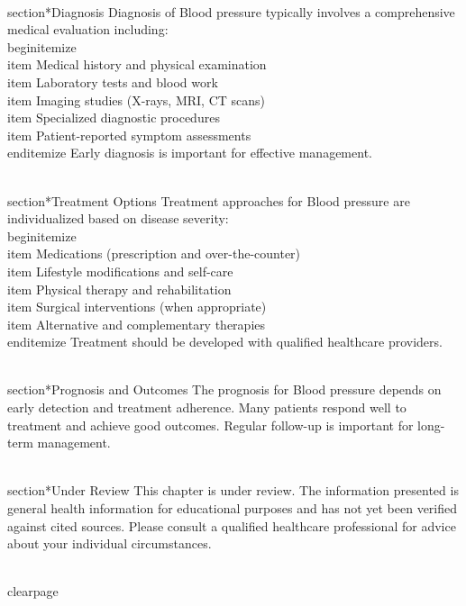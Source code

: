 \\section*{Diagnosis}
Diagnosis of Blood pressure typically involves a comprehensive medical evaluation including:
\\begin{itemize}
  \\item Medical history and physical examination
  \\item Laboratory tests and blood work
  \\item Imaging studies (X-rays, MRI, CT scans)
  \\item Specialized diagnostic procedures
  \\item Patient-reported symptom assessments
\\end{itemize}
Early diagnosis is important for effective management.

\\section*{Treatment Options}
Treatment approaches for Blood pressure are individualized based on disease severity:
\\begin{itemize}
  \\item Medications (prescription and over-the-counter)
  \\item Lifestyle modifications and self-care
  \\item Physical therapy and rehabilitation
  \\item Surgical interventions (when appropriate)
  \\item Alternative and complementary therapies
\\end{itemize}
Treatment should be developed with qualified healthcare providers.

\\section*{Prognosis and Outcomes}
The prognosis for Blood pressure depends on early detection and treatment adherence. Many patients respond well to treatment and achieve good outcomes. Regular follow-up is important for long-term management.

\\section*{Under Review}
This chapter is under review. The information presented is general health information for educational purposes and has not yet been verified against cited sources. Please consult a qualified healthcare professional for advice about your individual circumstances.

\\clearpage
